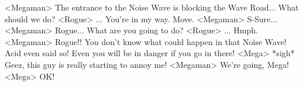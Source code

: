 <Megaman> The entrance to the Noise Wave is blocking the Wave Road... 
What should we do? 
<Rogue> ... 
You're in my way. Move. 
<Megaman> S-Sure... 
<Megaman> Rogue... What are you going to do? 
<Rogue> ... 
Hmph. 
<Megaman> Rogue!! 
You don't know what could happen in that Noise Wave! 
Acid even said so! 
Even you will be in danger if you go in there! 
<Mega> *sigh* Geez, this guy is really starting to annoy me! 
<Megaman> We're going, Mega! 
<Mega> OK! 
